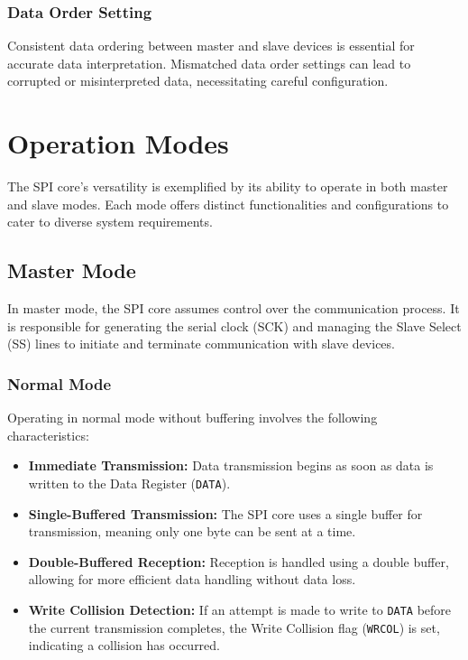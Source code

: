 \documentclass{article}
\begin{document}
\subsubsection{Data Order Setting}
Consistent data ordering between master and slave devices is essential for accurate data interpretation. Mismatched data order settings can lead to corrupted or misinterpreted data, necessitating careful configuration.

\section{Operation Modes}
The SPI core's versatility is exemplified by its ability to operate in both master and slave modes. Each mode offers distinct functionalities and configurations to cater to diverse system requirements.

\subsection{Master Mode}
In master mode, the SPI core assumes control over the communication process. It is responsible for generating the serial clock (SCK) and managing the Slave Select (SS) lines to initiate and terminate communication with slave devices.

\subsubsection{Normal Mode}
Operating in normal mode without buffering involves the following characteristics:

\begin{itemize}
    \item \textbf{Immediate Transmission:} Data transmission begins as soon as data is written to the Data Register (\texttt{DATA}).
    \item \textbf{Single-Buffered Transmission:} The SPI core uses a single buffer for transmission, meaning only one byte can be sent at a time.
    \item \textbf{Double-Buffered Reception:} Reception is handled using a double buffer, allowing for more efficient data handling without data loss.
    \item \textbf{Write Collision Detection:} If an attempt is made to write to \texttt{DATA} before the current transmission completes, the Write Collision flag (\texttt{WRCOL}) is set, indicating a collision has occurred.
\end{itemize}
\end{document}
